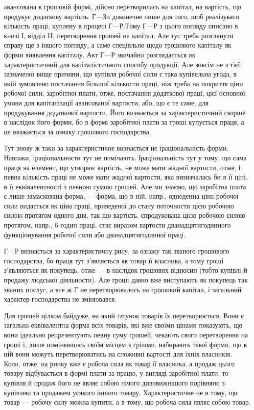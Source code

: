 \parcont{}  %
авансована в грошовій формі, дійсно перетворилась на капітал, на вартість,
що продукує додаткову вартість. $Г — Зп$ доконечне лише для того,
щоб реалізувати кількість праці, куплену в процесі $Г — Р. Т$ому $Г — Р$
з цього погляду описано в книзі І, відділ II, перетворення грошей
на капітал. Але тут треба розглянути справу ще з іншого погляду,
а саме спеціяльно щодо грошового капіталу як форми виявлення капіталу.
Акт $Г — Р$ звичайно розглядається як характеристичний для капіталістичного
способу продукції. Але зовсім не з тієї, зазначеної вище причини,
що купівля робочої сили є така купівельна угода, в якій зумовлено
постачання більшої кількости праці, ніж треба на покриття ціни робочої
сили, заробітної плати, отже, постачання додаткової праці, цієї основної
умови для капіталізації авансованої вартости, або, що є те саме, для
продукування додаткової вартости. Його визнається за характеристичний
скорше в наслідок його форми, бо в формі заробітної плати за гроші
купується праця, а це вважається за ознаку грошового господарства.

Тут знову ж таки за характеристичне визнається не іраціональність
форми. Навпаки, іраціональности тут не помічають. Іраціональність тут у
тому, що сама праця як елемент, що утворює вартість, не може мати
жадної вартости, отже, і певна кількість праці не може мати жадної
вартости, яка визначалась би в її ціні, в її еквівалентності з певною
сумою грошей. Але ми знаємо, що заробітна плата є лише замаскована
форма, — форма, що в ній, напр., одноденна ціна робочої сили видається
як ціна праці, приведеної до стану поточности цією робочою силою протягом
одного дня, так що вартість, спродукована цією робочою силою
протягом, напр., 6 годин праці, стає виразом вартости дванадцятигодинного
функціонування робочої сили або дванадцятигодинної праці.

$Г — Р$ визнається за характеристичну рису, за ознаку так званого грошового
господарства, бо праця тут з’являється як товар її власника, а тому
гроші з’являються як покупець, отже — в наслідок грошових відносин
(тобто купівлі й продажу людської діяльности). Але гроші давно вже
виступають як покупець так званих послуг, а все ж Г не перетворювалось
на грошовий капітал, і загальний характер господарства не
змінювався.

Для грошей цілком байдуже, на який ґатунок товарів їх перетворюється.
Вони є загальна еквівалентна форма всіх товарів, які вже
своїми цінами показують, що вони ідеально репрезентують певну суму грошей,
чекають свого перетворення на гроші і, лише помінявшись своїм місцем
з грішми, набирають такої форми, що в ній вони можуть перетворюватись на
споживні вартості для їхніх власників. Коли, отже, на ринку вже є робоча
сила як товар її власника, а продаж цього товару відбувається в формі
плати за працю, у вигляді заробітної плати, то купівля й продаж його
не являє собою нічого дивовижнішого порівняно з купівлею та
продажем усякого іншого товару. Характеристичне не в тому, що товар
— робочу силу можна купити, а в тому, що робоча сила являє собою
товар.
